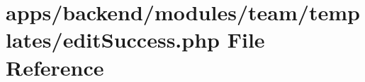 \hypertarget{backend_2modules_2team_2templates_2edit_success_8php}{\section{apps/backend/modules/team/templates/edit\-Success.php File Reference}
\label{backend_2modules_2team_2templates_2edit_success_8php}
}
